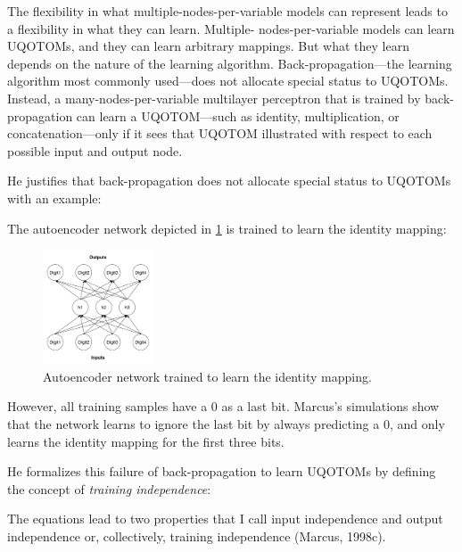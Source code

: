 \documentclass[../../main.tex]{subfiles}
\begin{document}
\begin{citecallout}
    The flexibility in what multiple-nodes-per-variable models
    can represent leads to a flexibility in what they can learn. Multiple-
    nodes-per-variable models can learn UQOTOMs, and they can learn
    arbitrary mappings. But what they learn depends on the nature of the
    learning algorithm. Back-propagation—the learning algorithm most
    commonly used—does not allocate special status to UQOTOMs. Instead, a many-nodes-per-variable multilayer perceptron that is trained
    by back-propagation can learn a UQOTOM—such as identity, multiplication, or concatenation—only if it sees that UQOTOM illustrated with
    respect to each possible input and output node.
\end{citecallout}

He justifies that back-propagation does not allocate special status to UQOTOMs with an example:

\begin{example}
    The autoencoder network depicted in \ref{fig:identity_autoencoder} is trained to learn the identity mapping:

    \begin{figure}[H]
        \centering
        \includegraphics[width=0.3\textwidth]{chapters/relations_between_variables/network.png}
        \caption{Autoencoder network trained to learn the identity mapping.}
        \label{fig:identity_autoencoder}
    \end{figure}

    However, all training samples have a 0 as a last bit. Marcus's simulations show that the network learns to ignore the last bit by always predicting a 0, and only learns the identity mapping for the first three bits.
\end{example}

He formalizes this failure of back-propagation to learn UQOTOMs by defining the concept of \emph{training independence}:

\begin{citecallout}
    The equations lead to two properties that I call input independence and
    output independence or, collectively, training independence (Marcus, 1998c).
\end{citecallout}
\end{document}
